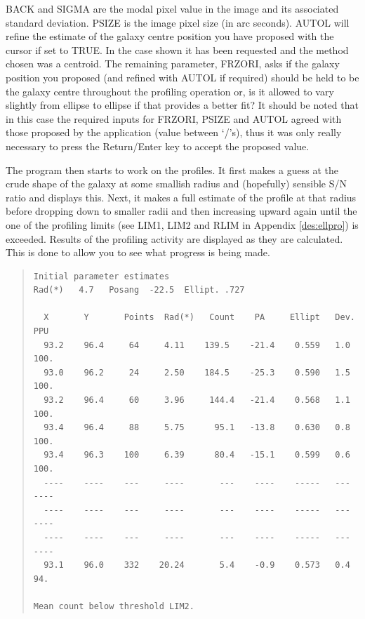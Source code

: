 \documentclass[twoside,11pt]{article}
\newenvironment{myquote}{\begin{quote}\begin{small}}{\end{small}\end{quote}}
\begin{document}
BACK and SIGMA are the modal pixel value in the image and its associated
standard deviation. PSIZE is the image pixel size (in arc seconds). AUTOL will refine 
the estimate of the galaxy centre position you have proposed with the cursor
if set to TRUE. In the case shown it has been requested and the method
chosen was a centroid. The remaining parameter, FRZORI, asks if the galaxy 
position you proposed (and refined with AUTOL if required) should be held to 
be the galaxy centre throughout the profiling operation or, is it allowed to vary slightly 
from ellipse to ellipse if that provides a better fit? It should be noted  
that in this case the required inputs for FRZORI, PSIZE and AUTOL agreed with 
those proposed by
the application (value between `/'s), thus it was only really necessary to
press the Return/Enter key to accept the proposed value. 

The program then starts to work on the profiles. It first makes a guess at 
the crude shape of the galaxy at some smallish radius and (hopefully) 
sensible S/N ratio and displays this.
Next, it makes a full estimate of the profile at that radius before dropping
down to smaller radii and then increasing upward again until the
one of the profiling limits (see LIM1, LIM2 and RLIM in Appendix 
\ref{des:ellpro})
is exceeded. Results of the
profiling activity are displayed as they are calculated. This is done to allow
you to see what progress is being made.

\begin{myquote}
\begin{verbatim}
Initial parameter estimates
Rad(*)   4.7   Posang  -22.5  Ellipt. .727

  X       Y       Points  Rad(*)   Count    PA     Ellipt   Dev.   PPU
  93.2    96.4     64     4.11    139.5    -21.4    0.559   1.0    100.
  93.0    96.2     24     2.50    184.5    -25.3    0.590   1.5    100.
  93.2    96.4     60     3.96     144.4   -21.4    0.568   1.1    100.
  93.4    96.4     88     5.75      95.1   -13.8    0.630   0.8    100.
  93.4    96.3    100     6.39      80.4   -15.1    0.599   0.6    100.
  ----    ----    ---     ----       ---    ----    -----   ---    ----
  ----    ----    ---     ----       ---    ----    -----   ---    ----
  ----    ----    ---     ----       ---    ----    -----   ---    ----
  93.1    96.0    332    20.24       5.4    -0.9    0.573   0.4     94.
 
Mean count below threshold LIM2.
\end{verbatim}
\end{myquote}
\end{document}
